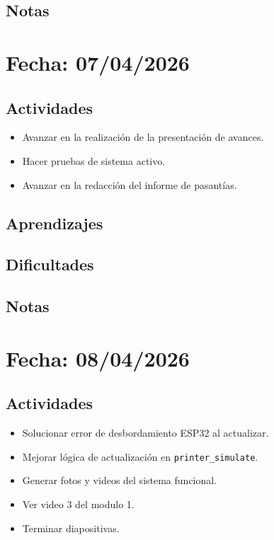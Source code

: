 \documentclass[12pt, a4paper]{article}
\begin{document}
    \subsection*{Notas}

    \section*{Fecha: 07/04/2026}

    \subsection*{Actividades}

    \begin{itemize}
        \item Avanzar en la realización de la presentación de avances.
        \item Hacer pruebas de sistema activo.
        \item Avanzar en la redacción del informe de pasantías.
    \end{itemize}

    \subsection*{Aprendizajes}

    \subsection*{Dificultades}

    \subsection*{Notas}

    \section*{Fecha: 08/04/2026}

    \subsection*{Actividades}

    \begin{itemize}
        \item Solucionar error de desbordamiento ESP32 al actualizar.
        \item Mejorar lógica de actualización en \texttt{printer\_simulate}.
        \item Generar fotos y videos del sistema funcional.
        \item Ver video 3 del modulo 1.
        \item Terminar diapositivas.
    \end{itemize}
\end{document}
